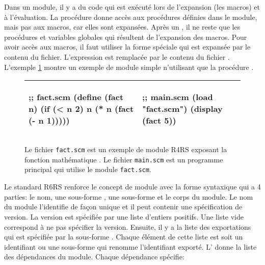 Dans un module, il y a du code qui est exécuté lors de l'expansion (les macros)
et à l'évaluation. La procédure  donne accès aux procédures définies
dans le module, mais pas aux macros, car elles sont expansées.  Après un
, il ne reste que les procédures et variables globales qui
résultent de l'expansion des macros.  Pour avoir accès aux macros, il faut
utiliser la forme spéciale  qui est expansée par le contenu du
fichier.  L'expression  est remplacée par le
contenu du fichier . L'exemple \ref{fig:r4rs_fact} montre un
exemple de module simple n'utilisant que la procédure .

\begin{figure}[ht]
  \begin{center}
    \begin{tabular}{|l|l|}
    \hline
    \begin{mplisting}{0.4}
;; fact.scm
(define (fact n)
  (if (< n 2)
    n
    (* n (fact (- n 1)))))
\end{mplisting} &
    \begin{mplisting}{0.4}
;; main.scm
(load "fact.scm")
(display (fact 5))
\end{mplisting} \\\hline
    \end{tabular}
  \end{center}

  \caption{Le fichier \texttt{fact.scm} est un exemple de module R4RS exposant
  la fonction mathématique . Le fichier \texttt{main.scm} est un
  programme principal qui utilise le module \texttt{fact.scm}.}
  \label{fig:r4rs_fact}
\end{figure}



Le standard R6RS\cite{Scheme:R6RS} renforce le concept de module avec la forme
syntaxique  qui a 4 parties: le nom, une
sous-forme , une sous-forme  et le corps du
module. Le nom du module l'identifie de façon unique et il peut contenir une
spécification de version. La version est spécifiée par une liste d'entiers
positifs. Une liste vide \lstcode{()} correspond à ne pas spécifier la
version. Ensuite, il y a la liste des exportations qui est spécifiée par la sous-forme
. Chaque élément de cette liste est soit un identifiant ou une
sous-forme  qui renomme l'identifiant exporté.
L' donne la liste des dépendances du module. Chaque dépendance
spécifie:

